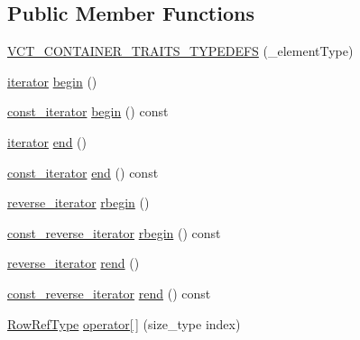 \subsection*{Public Member Functions}
\begin{DoxyCompactItemize}
\item 
\hyperlink{classvct_fixed_size_matrix_base_a716954f029505167d26352caabc507a1}{V\-C\-T\-\_\-\-C\-O\-N\-T\-A\-I\-N\-E\-R\-\_\-\-T\-R\-A\-I\-T\-S\-\_\-\-T\-Y\-P\-E\-D\-E\-F\-S} (\-\_\-element\-Type)
\item 
\hyperlink{classvct_fixed_size_const_matrix_base_a4a1ca42894c9dac29243adf6ac266205}{iterator} \hyperlink{classvct_fixed_size_matrix_base_ad871cc7962c88a2414d72e1538b3e674}{begin} ()
\item 
\hyperlink{classvct_fixed_size_const_matrix_base_a896eacc5ccf7915b3e109bf9dbded884}{const\-\_\-iterator} \hyperlink{classvct_fixed_size_matrix_base_a2b4acb2bfacb2b898129f2be525ef442}{begin} () const 
\item 
\hyperlink{classvct_fixed_size_const_matrix_base_a4a1ca42894c9dac29243adf6ac266205}{iterator} \hyperlink{classvct_fixed_size_matrix_base_aaf195ed7f31484143ba4b62e1ec6d1c0}{end} ()
\item 
\hyperlink{classvct_fixed_size_const_matrix_base_a896eacc5ccf7915b3e109bf9dbded884}{const\-\_\-iterator} \hyperlink{classvct_fixed_size_matrix_base_ac0c21f75b0523789faac881def24a8d2}{end} () const 
\item 
\hyperlink{classvct_fixed_size_const_matrix_base_a7611e666969b09bd846c46a1a85401b0}{reverse\-\_\-iterator} \hyperlink{classvct_fixed_size_matrix_base_ad5a7511aafb636db3f1199b8301e6059}{rbegin} ()
\item 
\hyperlink{classvct_fixed_size_const_matrix_base_a86918b3da51e15dce72b62abdc6378fa}{const\-\_\-reverse\-\_\-iterator} \hyperlink{classvct_fixed_size_matrix_base_a1a5513f5ef4414ccd75b300e797269dc}{rbegin} () const 
\item 
\hyperlink{classvct_fixed_size_const_matrix_base_a7611e666969b09bd846c46a1a85401b0}{reverse\-\_\-iterator} \hyperlink{classvct_fixed_size_matrix_base_a2554e19ff6668b7f6292e50939688f10}{rend} ()
\item 
\hyperlink{classvct_fixed_size_const_matrix_base_a86918b3da51e15dce72b62abdc6378fa}{const\-\_\-reverse\-\_\-iterator} \hyperlink{classvct_fixed_size_matrix_base_a433156cc1b2714e6400a005df46c6a0c}{rend} () const 
\item 
\hyperlink{classvct_fixed_size_const_matrix_base_a2ce1bc7d955f66d28462cb34b62d69b7}{Row\-Ref\-Type} \hyperlink{classvct_fixed_size_matrix_base_ac716ed964c34c1a66b887451f0610677}{operator\mbox{[}$\,$\mbox{]}} (size\-\_\-type index)

\end{DoxyCompactItemize}
